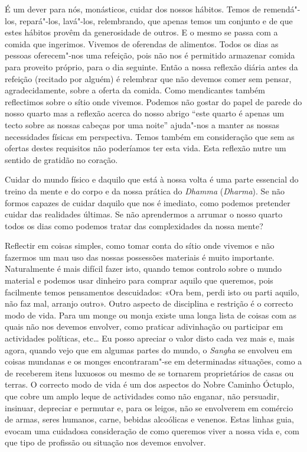 É um dever para nós, monásticos, cuidar dos nossos hábitos. Temos de
remendá"-los, repará"-los, lavá"-los, relembrando, que apenas temos um
conjunto e de que estes hábitos provêm da generosidade de outros. E o
mesmo se passa com a comida que ingerimos. Vivemos de oferendas de
alimentos. Todos os dias as pessoas oferecem"-nos uma refeição, pois não
nos é permitido armazenar comida para proveito próprio, para o dia
seguinte. Então a nossa reflexão diária antes da refeição (recitado por
alguém) é relembrar que não devemos comer sem pensar, agradecidamente,
sobre a oferta da comida. Como mendicantes também reflectimos sobre o
sítio onde vivemos. Podemos não gostar do papel de parede do nosso
quarto mas a reflexão acerca do nosso abrigo ``este quarto é apenas um
tecto sobre as nossas cabeças por uma noite'' ajuda"-nos a manter as
nossas necessidades físicas em perspectiva. Temos também em consideração
que sem as ofertas destes requisitos não poderíamos ter esta vida. Esta
reflexão nutre um sentido de gratidão no coração.

Cuidar do mundo físico e daquilo que está à nossa volta é uma parte
essencial do treino da mente e do corpo e da nossa prática do
\emph{Dhamma} (\emph{Dharma}). Se não formos capazes de cuidar daquilo
que nos é imediato, como podemos pretender cuidar das realidades
últimas. Se não aprendermos a arrumar o nosso quarto todos os dias como
podemos tratar das complexidades da nossa mente?

Reflectir em coisas simples, como tomar conta do sítio onde vivemos e
não fazermos um mau uso das nossas possessões materiais é muito
importante. Naturalmente é mais difícil fazer isto, quando temos
controlo sobre o mundo material e podemos usar dinheiro para comprar
aquilo que queremos, pois facilmente temos pensamentos descuidados: «Ora
bem, perdi isto ou parti aquilo, não faz mal, arranjo outro». Outro
aspecto de disciplina e restrição é o correcto modo de vida. Para um
monge ou monja existe uma longa lista de coisas com as quais não nos
devemos envolver, como praticar adivinhação ou participar em actividades
políticas, etc\ldots{} Eu posso apreciar o valor disto cada vez mais e, mais
agora, quando vejo que em algumas partes do mundo, o \emph{Sangha} se
envolveu em coisas mundanas e os monges encontraram"-se em determinadas
situações, como a de receberem itens luxuosos ou mesmo de se tornarem
proprietários de casas ou terras. O correcto modo de vida é um dos
aspectos do Nobre Caminho Óctuplo, que cobre um amplo leque de
actividades como não enganar, não persuadir, insinuar, depreciar e
permutar e, para os leigos, não se envolverem em comércio de armas,
seres humanos, carne, bebidas alcoólicas e venenos. Estas linhas guia,
evocam uma cuidadosa consideração de como queremos viver a nossa vida e,
com que tipo de profissão ou situação nos devemos envolver.

